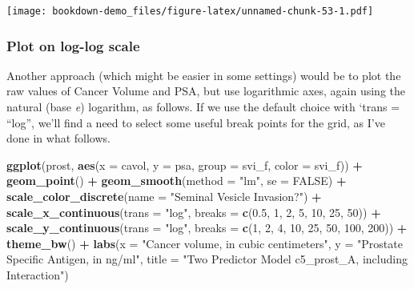\documentclass[]{book}
\newenvironment{Shaded}{\begin{snugshade}}{\end{snugshade}}
\newcommand{\KeywordTok}[1]{\textcolor[rgb]{0.13,0.29,0.53}{\textbf{#1}}}
\newcommand{\DataTypeTok}[1]{\textcolor[rgb]{0.13,0.29,0.53}{#1}}
\newcommand{\DecValTok}[1]{\textcolor[rgb]{0.00,0.00,0.81}{#1}}
\newcommand{\FloatTok}[1]{\textcolor[rgb]{0.00,0.00,0.81}{#1}}
\newcommand{\StringTok}[1]{\textcolor[rgb]{0.31,0.60,0.02}{#1}}
\newcommand{\OtherTok}[1]{\textcolor[rgb]{0.56,0.35,0.01}{#1}}
\newcommand{\OperatorTok}[1]{\textcolor[rgb]{0.81,0.36,0.00}{\textbf{#1}}}
\newcommand{\NormalTok}[1]{#1}
\theoremstyle{definition}
\theoremstyle{definition}
\theoremstyle{definition}
\theoremstyle{remark}
\begin{document}
\texttt{[image: bookdown-demo\_files/figure-latex/unnamed-chunk-53-1.pdf]}

\subsubsection{Plot on log-log scale}\label{plot-on-log-log-scale}

Another approach (which might be easier in some settings) would be to
plot the raw values of Cancer Volume and PSA, but use logarithmic axes,
again using the natural (base \emph{e}) logarithm, as follows. If we use
the default choice with `trans = ``log'', we'll find a need to select
some useful break points for the grid, as I've done in what follows.

\begin{Shaded}
\begin{Highlighting}[]
\KeywordTok{ggplot}\NormalTok{(prost, }\KeywordTok{aes}\NormalTok{(}\DataTypeTok{x =}\NormalTok{ cavol, }\DataTypeTok{y =}\NormalTok{ psa, }\DataTypeTok{group =}\NormalTok{ svi_f, }\DataTypeTok{color =}\NormalTok{ svi_f)) }\OperatorTok{+}
\StringTok{    }\KeywordTok{geom_point}\NormalTok{() }\OperatorTok{+}
\StringTok{    }\KeywordTok{geom_smooth}\NormalTok{(}\DataTypeTok{method =} \StringTok{"lm"}\NormalTok{, }\DataTypeTok{se =} \OtherTok{FALSE}\NormalTok{) }\OperatorTok{+}\StringTok{ }
\StringTok{    }\KeywordTok{scale_color_discrete}\NormalTok{(}\DataTypeTok{name =} \StringTok{"Seminal Vesicle Invasion?"}\NormalTok{) }\OperatorTok{+}
\StringTok{    }\KeywordTok{scale_x_continuous}\NormalTok{(}\DataTypeTok{trans =} \StringTok{"log"}\NormalTok{, }
                       \DataTypeTok{breaks =} \KeywordTok{c}\NormalTok{(}\FloatTok{0.5}\NormalTok{, }\DecValTok{1}\NormalTok{, }\DecValTok{2}\NormalTok{, }\DecValTok{5}\NormalTok{, }\DecValTok{10}\NormalTok{, }\DecValTok{25}\NormalTok{, }\DecValTok{50}\NormalTok{)) }\OperatorTok{+}
\StringTok{    }\KeywordTok{scale_y_continuous}\NormalTok{(}\DataTypeTok{trans =} \StringTok{"log"}\NormalTok{, }
                       \DataTypeTok{breaks =} \KeywordTok{c}\NormalTok{(}\DecValTok{1}\NormalTok{, }\DecValTok{2}\NormalTok{, }\DecValTok{4}\NormalTok{, }\DecValTok{10}\NormalTok{, }\DecValTok{25}\NormalTok{, }\DecValTok{50}\NormalTok{, }\DecValTok{100}\NormalTok{, }\DecValTok{200}\NormalTok{)) }\OperatorTok{+}
\StringTok{    }\KeywordTok{theme_bw}\NormalTok{() }\OperatorTok{+}
\StringTok{    }\KeywordTok{labs}\NormalTok{(}\DataTypeTok{x =} \StringTok{"Cancer volume, in cubic centimeters"}\NormalTok{, }
         \DataTypeTok{y =} \StringTok{"Prostate Specific Antigen, in ng/ml"}\NormalTok{, }
         \DataTypeTok{title =} \StringTok{"Two Predictor Model c5_prost_A, including Interaction"}\NormalTok{)}
\end{Highlighting}
\end{Shaded}
\end{document}
